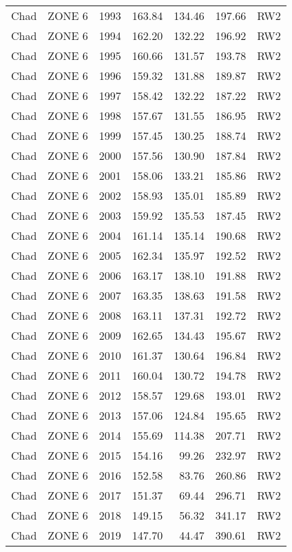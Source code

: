 \begin{longtable}{lllrrrl}
  Chad & ZONE 6 & 1993 & 163.84 & 134.46 & 197.66 & RW2 \\ 
  Chad & ZONE 6 & 1994 & 162.20 & 132.22 & 196.92 & RW2 \\ 
  Chad & ZONE 6 & 1995 & 160.66 & 131.57 & 193.78 & RW2 \\ 
  Chad & ZONE 6 & 1996 & 159.32 & 131.88 & 189.87 & RW2 \\ 
  Chad & ZONE 6 & 1997 & 158.42 & 132.22 & 187.22 & RW2 \\ 
  Chad & ZONE 6 & 1998 & 157.67 & 131.55 & 186.95 & RW2 \\ 
  Chad & ZONE 6 & 1999 & 157.45 & 130.25 & 188.74 & RW2 \\ 
  Chad & ZONE 6 & 2000 & 157.56 & 130.90 & 187.84 & RW2 \\ 
  Chad & ZONE 6 & 2001 & 158.06 & 133.21 & 185.86 & RW2 \\ 
  Chad & ZONE 6 & 2002 & 158.93 & 135.01 & 185.89 & RW2 \\ 
  Chad & ZONE 6 & 2003 & 159.92 & 135.53 & 187.45 & RW2 \\ 
  Chad & ZONE 6 & 2004 & 161.14 & 135.14 & 190.68 & RW2 \\ 
  Chad & ZONE 6 & 2005 & 162.34 & 135.97 & 192.52 & RW2 \\ 
  Chad & ZONE 6 & 2006 & 163.17 & 138.10 & 191.88 & RW2 \\ 
  Chad & ZONE 6 & 2007 & 163.35 & 138.63 & 191.58 & RW2 \\ 
  Chad & ZONE 6 & 2008 & 163.11 & 137.31 & 192.72 & RW2 \\ 
  Chad & ZONE 6 & 2009 & 162.65 & 134.43 & 195.67 & RW2 \\ 
  Chad & ZONE 6 & 2010 & 161.37 & 130.64 & 196.84 & RW2 \\ 
  Chad & ZONE 6 & 2011 & 160.04 & 130.72 & 194.78 & RW2 \\ 
  Chad & ZONE 6 & 2012 & 158.57 & 129.68 & 193.01 & RW2 \\ 
  Chad & ZONE 6 & 2013 & 157.06 & 124.84 & 195.65 & RW2 \\ 
  Chad & ZONE 6 & 2014 & 155.69 & 114.38 & 207.71 & RW2 \\ 
  Chad & ZONE 6 & 2015 & 154.16 & 99.26 & 232.97 & RW2 \\ 
  Chad & ZONE 6 & 2016 & 152.58 & 83.76 & 260.86 & RW2 \\ 
  Chad & ZONE 6 & 2017 & 151.37 & 69.44 & 296.71 & RW2 \\ 
  Chad & ZONE 6 & 2018 & 149.15 & 56.32 & 341.17 & RW2 \\ 
  Chad & ZONE 6 & 2019 & 147.70 & 44.47 & 390.61 & RW2 \\ 

\end{longtable}
